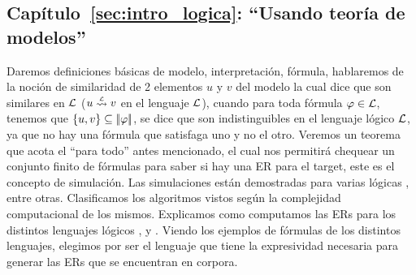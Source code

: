 \subsection{Cap\'itulo~\ref{sec:intro_logica}: ``Usando teor\'ia de modelos''} 
Daremos definiciones b\'asicas de modelo, 
interpretaci\'on, f\'ormula, hablaremos de la noci\'on de similaridad de 2 elementos $u$ y $v$ del modelo la cual dice que son 
similares en $\mathcal{L}$ ($u \simil{\+L} v$ en el lenguaje $\mathcal{L}$), cuando para toda f\'ormula $\varphi \in \mathcal{L}$, tenemos que 
$\{u,v\} \subseteq |\!|\varphi|\!|$, se dice que son indistinguibles en el lenguaje l\'ogico $\mathcal{L}$, ya que no hay una f\'ormula que satisfaga uno 
y no el otro. Veremos un teorema que acota el ``para todo'' antes mencionado, el cual nos permitir\'a chequear un conjunto finito de f\'ormulas para saber si hay una ER para el target, este es el concepto de simulaci\'on. Las simulaciones est\'an demostradas para varias l\'ogicas \ALC, \EL entre otras. Clasificamos los algoritmos vistos seg\'un la complejidad computacional de los mismos. Explicamos como computamos las ERs para los distintos lenguajes l\'ogicos \FOL, \ALC y \EL. Viendo los ejemplos de f\'ormulas de los distintos lenguajes, elegimos \EL por ser el lenguaje que tiene la expresividad necesaria para generar las ERs que se encuentran en corpora.%
%

